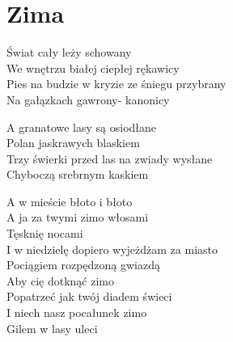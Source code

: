 \section{Zima}
\begin{text}
Świat cały leży schowany\\
We wnętrzu białej ciepłej rękawicy\\
Pies na budzie w kryzie ze śniegu przybrany\\
Na gałązkach gawrony- kanonicy

A granatowe lasy są osiodłane\\
Polan jaskrawych blaskiem\\
Trzy świerki przed las na zwiady wysłane\\
Chyboczą srebrnym kaskiem

A w mieście błoto i błoto\\
A ja za twymi zimo włosami\\
Tęsknię nocami\\
I w niedzielę dopiero wyjeżdżam za miasto\\
Pociągiem rozpędzoną gwiazdą\\
Aby cię dotknąć zimo\\
Popatrzeć jak twój diadem świeci\\
I niech nasz pocałunek zimo\\
Gilem w lasy uleci
\end{text}